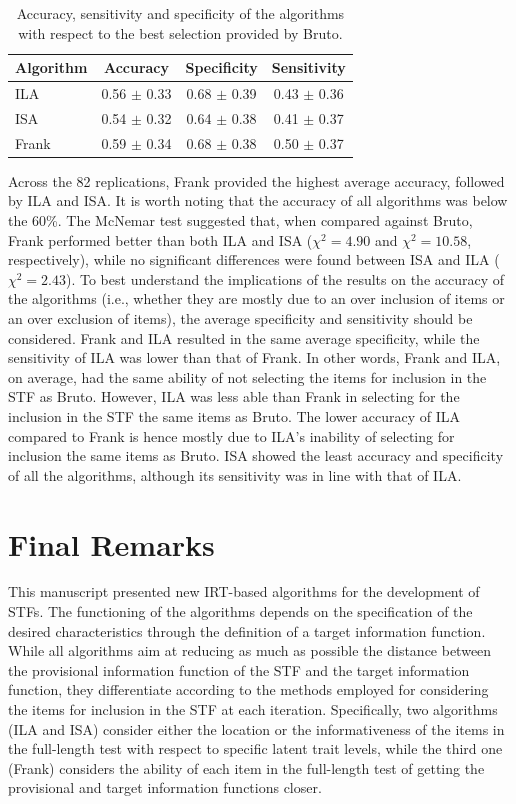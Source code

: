 \documentclass[12pt, a4paper, titilepage]{article}
\begin{document}
 

\begin{table}[!h]
	\centering
	\caption{\label{tab:accuracy} Accuracy, sensitivity and specificity of the algorithms with respect to the best selection provided by Bruto.}
	\begin{tabular}{l c c c}
		\hline
		Algorithm	&	Accuracy	&	Specificity	&	Sensitivity	\\\hline
		ILA	&	0.56 $\pm$ 0.33	&	0.68 $\pm$ 0.39	&	0.43 $\pm$ 0.36	\\
		ISA	&	0.54 $\pm$ 0.32	&	0.64 $\pm$ 0.38	&	0.41 $\pm$ 0.37	\\
		Frank	&	0.59 $\pm$ 0.34	&	0.68 $\pm$ 0.38	&	0.50 $\pm$ 0.37	\\\hline
		
	\end{tabular}
\end{table}


Across the 82 replications, Frank provided the highest average accuracy, followed by ILA and ISA. It is worth noting that the accuracy of all algorithms was below the 60\%. 
The McNemar test suggested that, when compared against Bruto, Frank performed better than both ILA and ISA ($\chi^2 = 4.90$ and $\chi^2 = 10.58$, respectively), while no significant differences were found between ISA and ILA ($\chi^2 = 2.43$).
To best understand the implications of the results on the accuracy of the algorithms (i.e., whether they are mostly due to an over inclusion of items or an over exclusion of items), the average specificity and sensitivity should be considered. Frank and ILA resulted in the same average specificity, while the sensitivity of ILA was lower than that of Frank. In other words, Frank and ILA, on average, had the same ability of not selecting the items for inclusion in the STF as Bruto. However, ILA was less able than Frank in selecting for the inclusion in the STF the same items as Bruto. The lower accuracy of ILA compared to Frank is hence mostly due to ILA's inability of selecting for inclusion the same items as Bruto. 
ISA showed the least accuracy and specificity of all the algorithms, although its sensitivity was in line with that of ILA. 

\section*{Final Remarks}

This manuscript presented new IRT-based algorithms for the development of STFs. The functioning of the algorithms depends on the specification of the desired characteristics through the definition of a target information function.
While all algorithms aim at reducing as much as possible the distance between the provisional information function of the STF and the target information function, they differentiate according to the methods employed for considering the items for inclusion in the STF at each iteration. Specifically, two algorithms (ILA and ISA) consider either the location or the informativeness of the items in the full-length test with respect to specific latent trait levels, while the third one (Frank) considers the ability of each item in the full-length test of getting the provisional and target information functions closer. 
\end{document}
